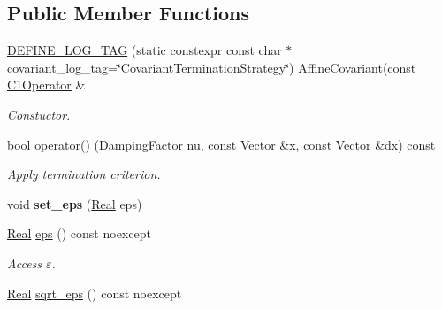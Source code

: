 \subsection*{Public Member Functions}
\begin{DoxyCompactItemize}
\item 
\hypertarget{classSpacy_1_1Newton_1_1Termination_1_1AffineCovariant_aa725dc117c4c563d4c1b0ca0f14feea9}{\hyperlink{classSpacy_1_1Newton_1_1Termination_1_1AffineCovariant_aa725dc117c4c563d4c1b0ca0f14feea9}{D\-E\-F\-I\-N\-E\-\_\-\-L\-O\-G\-\_\-\-T\-A\-G} (static constexpr const char $\ast$covariant\-\_\-log\-\_\-tag=\char`\"{}Covariant\-Termination\-Strategy\char`\"{}) Affine\-Covariant(const \hyperlink{classSpacy_1_1C1Operator}{C1\-Operator} \&}\label{classSpacy_1_1Newton_1_1Termination_1_1AffineCovariant_aa725dc117c4c563d4c1b0ca0f14feea9}

\begin{DoxyCompactList}\small\item\em Constuctor. \end{DoxyCompactList}\item 
bool \hyperlink{classSpacy_1_1Newton_1_1Termination_1_1AffineCovariant_aa33460372120d1ddcd3daf7c79140dcf}{operator()} (\hyperlink{classSpacy_1_1DampingFactor}{Damping\-Factor} nu, const \hyperlink{classSpacy_1_1Vector}{Vector} \&x, const \hyperlink{classSpacy_1_1Vector}{Vector} \&dx) const 
\begin{DoxyCompactList}\small\item\em Apply termination criterion. \end{DoxyCompactList}\item 
\hypertarget{classSpacy_1_1Mixin_1_1Eps_a818ab6dfab5e4eea583e1302bcc621f8}{void {\bfseries set\-\_\-eps} (\hyperlink{classSpacy_1_1Real}{Real} eps)}\label{classSpacy_1_1Mixin_1_1Eps_a818ab6dfab5e4eea583e1302bcc621f8}

\item 
\hypertarget{classSpacy_1_1Mixin_1_1Eps_a812b99b0abc1d78a34b4114907f23f52}{\hyperlink{classSpacy_1_1Real}{Real} \hyperlink{classSpacy_1_1Mixin_1_1Eps_a812b99b0abc1d78a34b4114907f23f52}{eps} () const noexcept}\label{classSpacy_1_1Mixin_1_1Eps_a812b99b0abc1d78a34b4114907f23f52}

\begin{DoxyCompactList}\small\item\em Access $\varepsilon$. \end{DoxyCompactList}\item 
\hypertarget{classSpacy_1_1Mixin_1_1Eps_a1c1b0ed7f14ed4967dc7da9295a136d4}{\hyperlink{classSpacy_1_1Real}{Real} \hyperlink{classSpacy_1_1Mixin_1_1Eps_a1c1b0ed7f14ed4967dc7da9295a136d4}{sqrt\-\_\-eps} () const noexcept}\label{classSpacy_1_1Mixin_1_1Eps_a1c1b0ed7f14ed4967dc7da9295a136d4}


\end{DoxyCompactItemize}
